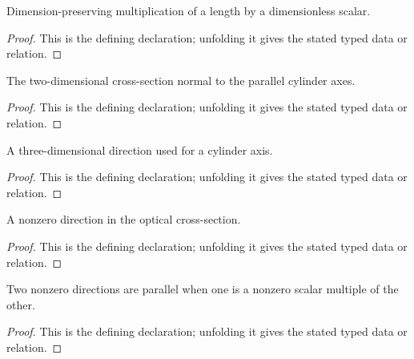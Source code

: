 \begin{definition}[scaleLength]
  \label{decl:physics:IPhO_2026_2_B_1:scaleLength}
  Dimension-preserving multiplication of a length by a dimensionless scalar.
\end{definition}
\begin{proof}
  This is the defining declaration; unfolding it gives the stated typed data or relation.
\end{proof}

\begin{definition}[CrossSection]
  \label{decl:physics:IPhO_2026_2_B_1:CrossSection}
  The two-dimensional cross-section normal to the parallel cylinder axes.
\end{definition}
\begin{proof}
  This is the defining declaration; unfolding it gives the stated typed data or relation.
\end{proof}

\begin{definition}[AxisDirection]
  \label{decl:physics:IPhO_2026_2_B_1:AxisDirection}
  A three-dimensional direction used for a cylinder axis.
\end{definition}
\begin{proof}
  This is the defining declaration; unfolding it gives the stated typed data or relation.
\end{proof}

\begin{definition}[RayDirection2D]
  \label{decl:physics:IPhO_2026_2_B_1:RayDirection2D}
  A nonzero direction in the optical cross-section.
\end{definition}
\begin{proof}
  This is the defining declaration; unfolding it gives the stated typed data or relation.
\end{proof}

\begin{definition}[ParallelDirections]
  \label{decl:physics:IPhO_2026_2_B_1:ParallelDirections}
  Two nonzero directions are parallel when one is a nonzero scalar multiple of the other.
\end{definition}
\begin{proof}
  This is the defining declaration; unfolding it gives the stated typed data or relation.
\end{proof}

